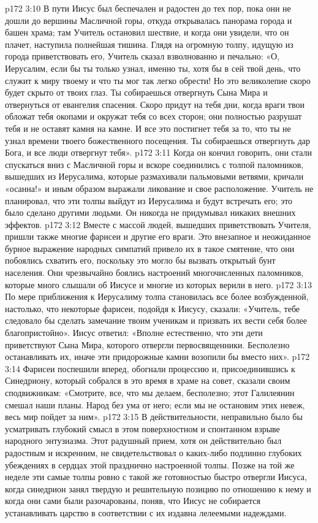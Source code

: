 \vs p172 3:10 В пути Иисус был беспечален и радостен до тех пор, пока они не дошли до вершины Масличной горы, откуда открывалась панорама города и башен храма; там Учитель остановил шествие, и когда они увидели, что он плачет, наступила полнейшая тишина. Глядя на огромную толпу, идущую из города приветствовать его, Учитель сказал взволнованно и печально: «О, Иерусалим, если бы ты только узнал, именно ты, хотя бы в сей твой день, что служит к миру твоему и что ты мог так легко обрести! Но это великолепие скоро будет скрыто от твоих глаз. Ты собираешься отвергнуть Сына Мира и отвернуться от евангелия спасения. Скоро придут на тебя дни, когда враги твои обложат тебя окопами и окружат тебя со всех сторон; они полностью разрушат тебя и не оставят камня на камне. И все это постигнет тебя за то, что ты не узнал времени твоего божественного посещения. Ты собираешься отвергнуть дар Бога, и все люди отвергнут тебя».
\vs p172 3:11 Когда он кончил говорить, они стали спускаться вниз с Масличной горы и вскоре соединились с толпой паломников, вышедших из Иерусалима, которые размахивали пальмовыми ветвями, кричали «осанна!» и иным образом выражали ликование и свое расположение. Учитель не планировал, что эти толпы выйдут из Иерусалима и будут встречать его; это было сделано другими людьми. Он никогда не придумывал никаких внешних эффектов.
\vs p172 3:12 Вместе с массой людей, вышедших приветствовать Учителя, пришли также многие фарисеи и другие его враги. Это внезапное и неожиданное бурное выражение народных симпатий привело их в такое смятение, что они побоялись схватить его, поскольку это могло бы вызвать открытый бунт населения. Они чрезвычайно боялись настроений многочисленных паломников, которые много слышали об Иисусе и многие из которых верили в него.
\vs p172 3:13 По мере приближения к Иерусалиму толпа становилась все более возбужденной, настолько, что некоторые фарисеи, подойдя к Иисусу, сказали: «Учитель, тебе следовало бы сделать замечание твоим ученикам и призвать их вести себя более благопристойно». Иисус ответил: «Вполне естественно, что эти дети приветствуют Сына Мира, которого отвергли первосвященники. Бесполезно останавливать их, иначе эти придорожные камни возопили бы вместо них».
\vs p172 3:14 Фарисеи поспешили вперед, обогнали процессию и, присоединившись к Синедриону, который собрался в это время в храме на совет, сказали своим сподвижникам: «Смотрите, все, что мы делаем, бесполезно; этот Галилеянин смешал наши планы. Народ без ума от него; если мы не остановим этих невеж, весь мир пойдет за ним».
\vs p172 3:15 В действительности, неправильно было бы усматривать глубокий смысл в этом поверхностном и спонтанном взрыве народного энтузиазма. Этот радушный прием, хотя он действительно был радостным и искренним, не свидетельствовал о каких\hyp{}либо подлинно глубоких убеждениях в сердцах этой празднично настроенной толпы. Позже на той же неделе эти самые толпы ровно с такой же готовностью быстро отвергли Иисуса, когда синедрион занял твердую и решительную позицию по отношению к нему и когда они сами были разочарованы, поняв, что Иисус не собирается устанавливать царство в соответствии с их издавна лелеемыми надеждами.
